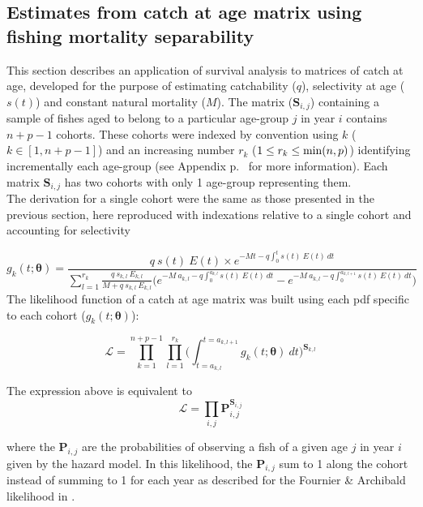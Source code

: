 \documentclass[12pt]{article}
\begin{document}
\subsection{Estimates from catch at age matrix using fishing mortality separability}

This section describes an application of survival analysis to matrices of catch at age, developed for the purpose of estimating catchability ($q$), selectivity at age ($s(t)$) and constant natural mortality ($M$). The matrix ($\bm{S}_{i,j}$) containing a sample of fishes aged to belong to a particular age-group $j$ in year $i$ contains $n+p-1$ cohorts. These cohorts were indexed by convention using $k$ ($k \in [1, n+p-1]$) and an increasing number $r_{k}$ ($ 1 \leq r_{k} \leq {\rm min}(n,p)$) identifying incrementally each age-group (see Appendix p.~\pageref{Appendix:DefinitionsOfMathematicalSymbols} for more information). Each matrix $\bm{S}_{i,j}$ has two cohorts with only 1 age-group representing them.\\

The derivation for a single cohort were the same as those presented in the previous section, here reproduced with indexations relative to a single cohort and accounting for selectivity

\begin{equation}
g_{k}(t; \bm{\theta}) = \frac{q \ s(t) \ E(t) \times e^{-Mt-q\int_{0}^{t} s(t) \ E(t) \ dt}}{\sum_{l=1}^{r_{k}} \frac{q \ s_{k,l} \ E_{k,l}}{M+q \ s_{k,l} \ E_{k,l}} \bigl ( e^{-M \ a_{k,l}-q\int_{0}^{a_{k,l}}s(t) \ E(t) \ dt} - e^{-M \ a_{k,l}-q\int_{0}^{a_{k,l+1}}s(t) \ E(t) \ dt} \bigr )} 
\end{equation}
\newline
The likelihood function of a catch at age matrix was built using each pdf specific to each cohort ($g_{k}(t; \bm{\theta})$):

\begin{equation}
\mathcal{L} = \prod_{k=1}^{n+p-1} \prod_{l=1}^{r_{k}}  \bigl ( \int_{t=a_{k,l}}^{t=a_{k,l+1}} g_{k}(t; \bm{\theta}) \ dt \bigr ) ^ {\bm{S}_{k,l}}
\end{equation}

The expression above is equivalent to 
\begin{equation}
\mathcal{L} = \prod_{i,j} \bm{P}_{i,j} ^ {\bm{S}_{i,j}}
\end{equation}

\noindent where the $\bm{P}_{i,j}$ are the probabilities of observing a fish of a given age $j$ in year $i$ given by the hazard model. In this likelihood, the $\bm{P}_{i,j}$ sum to 1 along the cohort instead of summing to 1 for each year as described for the Fournier \& Archibald likelihood in \cite{Four82a}. \\
\end{document}
